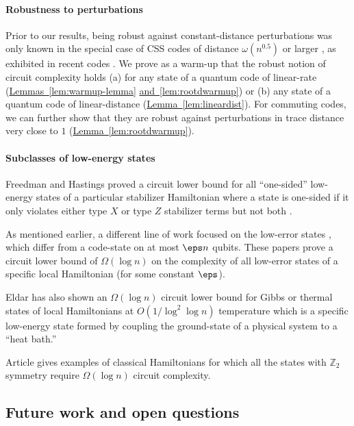 \documentclass[11pt]{article}
\newcommand{\expref}[2]{\texorpdfstring{\hyperref[#2]{#1~\ref{#2}}}{#1~\ref{#2}}}
\begin{document}
\paragraph{Robustness to perturbations}

Prior to our results, being robust %
against  %
constant-distance perturbations was only known in the special case of CSS codes of distance $\omega(n^{0.5})$ or larger \cite{8104078}, as exhibited in recent codes \cite{hastings2020fiber, panteleev2020quantum} . We prove as a warm-up that the robust notion of circuit complexity holds (a) for any state of a quantum code of linear-rate (\expref{Lemmas}{lem:warmup-lemma} \expref{and}{lem:rootdwarmup}) or (b) any state of a quantum code of linear-distance (\expref{Lemma}{lem:lineardist}). For commuting codes, we can further show that they are
robust %
against  %
perturbations in trace distance very close to $1$ (\expref{Lemma}{lem:rootdwarmup}).

\paragraph{Subclasses of low-energy states}
Freedman and Hastings proved a circuit lower bound for all ``one-sided'' low-energy states of a particular stabilizer Hamiltonian where a state is one-sided if it only violates either type $X$ or type $Z$ stabilizer terms but not both \cite{10.5555/2600498.2600507}. 

As mentioned earlier, a different line of work focused on the low-error states \cite{8104078}, which differ from a code-state on at most $\eps n$ qubits. These %
papers  %
prove a circuit lower bound of $\Omega(\log n)$ on the complexity of all low-error states of a specific local Hamiltonian \cite{8104078,nirkhe_et_al:LIPIcs:2018:9095} (for some constant $\eps$).

Eldar has also shown
%
an  %
$\Omega(\log n)$ circuit lower bound
%
for Gibbs or thermal states of local Hamiltonians at $O(1/\log^2 \log n)$ temperature \cite{Eldar2019RobustQE} which is a specific low-energy state formed by coupling the ground-state of a physical system to a ``heat bath.''

Article   %
\cite{BravyiKKT19} %
%
gives  %
examples of classical Hamiltonians for which all the states with $\mathbb{Z}_2$ symmetry require $\Omega(\log n)$ circuit complexity. 

\subsection{Future work and open questions}
\end{document}
